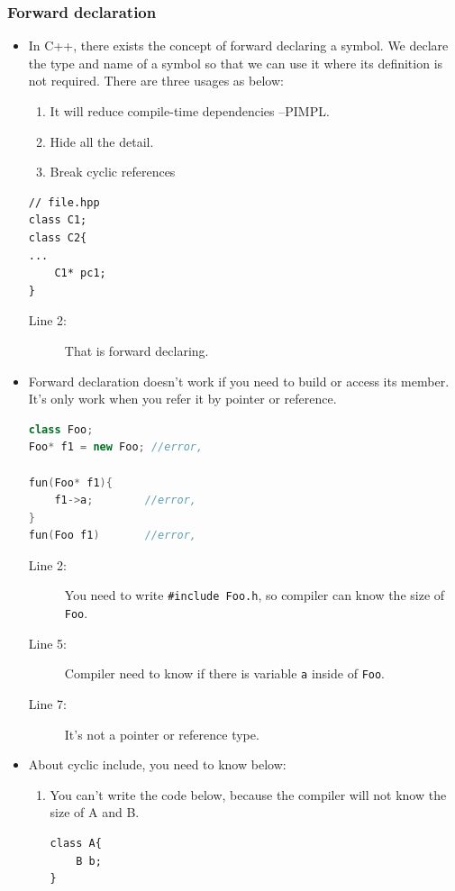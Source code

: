\documentclass[a4paper,11pt,twoside]{book}
\begin{document}
\subsubsection{Forward declaration}
\begin{itemize}
	\item In C++, there exists the concept of forward declaring a symbol. We declare the type and name of a symbol so that we can use it where its definition is not required. There are three usages as below:
	\begin{enumerate}
		\item It will reduce compile-time dependencies --PIMPL.
		\item Hide all the detail. 
		\item Break cyclic references
	\end{enumerate}
	
\begin{lstlisting}[numbers=none]
// file.hpp
class C1;
class C2{
...
	C1* pc1;
}
\end{lstlisting}
\begin{description}
	\item[Line 2:] That is forward declaring.
\end{description}
	
	\item Forward declaration doesn't work if you need to build or access its member. It's only work when you refer it by pointer or reference.
\begin{lstlisting}[frame=single, language=c++]
class Foo; 
Foo* f1 = new Foo; //error,
	
fun(Foo* f1){
	f1->a;        //error,  
}
fun(Foo f1)       //error, 
\end{lstlisting}
\begin{description}
	\item[Line 2:]  You need to write \texttt{\#include Foo.h}, so compiler can know the size of \texttt{Foo}.
	
	\item [Line 5:] Compiler need to know if there is variable \texttt{a} inside of \texttt{Foo}.
	
	\item [Line 7:] It's not a pointer or reference type.
\end{description}
	
	\item About cyclic include, you need to know below:
	\begin{enumerate}
		\item You can't write the code below, because the compiler will not know the size of A and B. 
\begin{lstlisting}[numbers=none]
class A{
	B b;
}


\end{lstlisting}
\end{enumerate}
\end{itemize}
\end{document}
